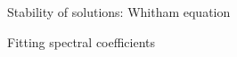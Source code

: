 \begin{frame}[t]{Stability of solutions: Whitham equation}
\end{frame}
\begin{frame}[t]{Fitting spectral coefficients}
\end{frame}
%
%
% 
% 
% 
% 
%
%
%
% 
% 
% 
%
%
%
% 
%
%
%
%
%
%
%
%
%
%
%
%
%
%

